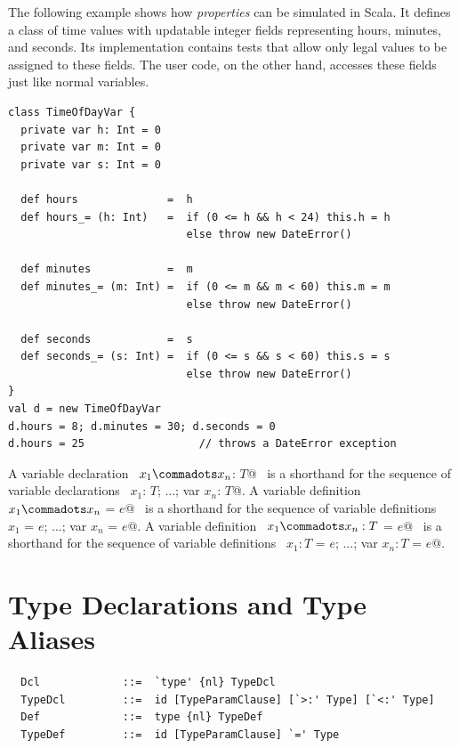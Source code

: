 \example The following example shows how {\em properties} can be
simulated in Scala. It defines a class  of time
values with updatable integer fields representing hours, minutes, and
seconds. Its implementation contains tests that allow only legal
values to be assigned to these fields. The user code, on the other
hand, accesses these fields just like normal variables.

\begin{lstlisting}
class TimeOfDayVar {
  private var h: Int = 0 
  private var m: Int = 0 
  private var s: Int = 0 

  def hours              =  h 
  def hours_= (h: Int)   =  if (0 <= h && h < 24) this.h = h 
                            else throw new DateError() 

  def minutes            =  m 
  def minutes_= (m: Int) =  if (0 <= m && m < 60) this.m = m
                            else throw new DateError() 

  def seconds            =  s 
  def seconds_= (s: Int) =  if (0 <= s && s < 60) this.s = s
                            else throw new DateError() 
}
val d = new TimeOfDayVar 
d.hours = 8; d.minutes = 30; d.seconds = 0 
d.hours = 25                  // throws a DateError exception
\end{lstlisting}

A variable declaration ~\lstinline@var $x_1 \commadots x_n$: $T$@~
is a
shorthand for the sequence of variable declarations
~\lstinline@var $x_1$: $T$; ...; var $x_n$: $T$@.
A variable definition ~\lstinline@var $x_1 \commadots x_n$ = $e$@~
is a
shorthand for the sequence of variable definitions
~\lstinline@var $x_1$ = $e$; ...; var $x_n$ = $e$@.
A variable definition ~\lstinline@var $x_1 \commadots x_n: T$ = $e$@~
is a
shorthand for the sequence of variable definitions
~\lstinline@var $x_1: T$ = $e$; ...; var $x_n: T$ = $e$@.

\section{Type Declarations and Type Aliases}
\label{sec:typedcl}
\label{sec:typealias}

\syntax\begin{lstlisting}
  Dcl             ::=  `type' {nl} TypeDcl
  TypeDcl         ::=  id [TypeParamClause] [`>:' Type] [`<:' Type]
  Def             ::=  type {nl} TypeDef
  TypeDef         ::=  id [TypeParamClause] `=' Type
\end{lstlisting}


